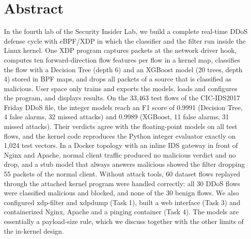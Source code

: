 \chapter*{Abstract}

In the fourth lab of the Security Insider Lab, we build a complete real-time DDoS defense cycle with eBPF/XDP in which the classifier and the filter run inside the Linux kernel. One XDP program captures packets at the network driver hook, computes ten forward-direction flow features per flow in a kernel map, classifies the flow with a Decision Tree (depth 6) and an XGBoost model (20 trees, depth 4) stored in BPF maps, and drops all packets of a source that is classified as malicious. User space only trains and exports the models, loads and configures the program, and displays results. On the 33,463 test flows of the CIC-IDS2017 Friday DDoS file, the integer models reach an F1 score of 0.9991 (Decision Tree, 4 false alarms, 32 missed attacks) and 0.9989 (XGBoost, 11 false alarms, 31 missed attacks). Their verdicts agree with the floating-point models on all test flows, and the kernel code reproduces the Python integer evaluator exactly on 1,024 test vectors. In a Docker topology with an inline IDS gateway in front of Nginx and Apache, normal client traffic produced no malicious verdict and no drop, and a stub model that always answers malicious showed the filter dropping 55 packets of the normal client. Without attack tools, 60 dataset flows replayed through the attached kernel program were handled correctly: all 30 DDoS flows were classified malicious and blocked, and none of the 30 benign flows. We also configured xdp-filter and xdpdump (Task 1), built a web interface (Task 3) and containerized Nginx, Apache and a pinging container (Task 4). The models are essentially a payload-size rule, which we discuss together with the other limits of the in-kernel design.
